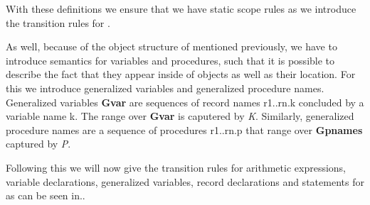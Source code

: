 With these definitions we ensure that we have static scope rules as we introduce the transition rules for \dazel{}.

As well, because of the object structure of \dazel{} mentioned previously, we have to introduce semantics for variables and procedures, such that it is possible to describe the fact that they appear inside of objects as well as their location. For this we introduce generalized variables and generalized procedure names.
Generalized variables \textbf{Gvar} are sequences of record names r1..rn.k concluded by a variable name k. The range over \textbf{Gvar} is caputered by \textit{K}.  
Similarly, generalized procedure names are a sequence of procedures r1..rn.p that range over \textbf{Gpnames} captured by \textit{P}.

Following this we will now give the transition rules for arithmetic expressions, variable declarations, generalized variables, record declarations and statements for \dazel{} as can be seen in..

